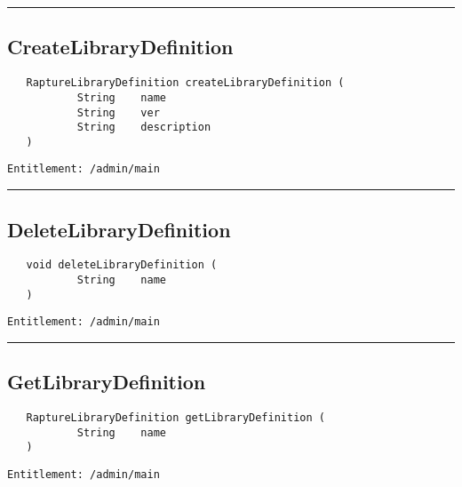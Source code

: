 \rule{12cm}{2pt}
\subsection{CreateLibraryDefinition}
\label{Api:CreateLibraryDefinition}
\begin{verbatim}
   RaptureLibraryDefinition createLibraryDefinition (
           String    name
           String    ver
           String    description
   )
\end{verbatim}
\begin{Verbatim}[fontsize=\small, formatcom=\color{Maroon}]
  Entitlement: /admin/main
\end{Verbatim}



\rule{12cm}{2pt}
\subsection{DeleteLibraryDefinition}
\label{Api:DeleteLibraryDefinition}
\begin{verbatim}
   void deleteLibraryDefinition (
           String    name
   )
\end{verbatim}
\begin{Verbatim}[fontsize=\small, formatcom=\color{Maroon}]
  Entitlement: /admin/main
\end{Verbatim}



\rule{12cm}{2pt}
\subsection{GetLibraryDefinition}
\label{Api:GetLibraryDefinition}
\begin{verbatim}
   RaptureLibraryDefinition getLibraryDefinition (
           String    name
   )
\end{verbatim}
\begin{Verbatim}[fontsize=\small, formatcom=\color{Maroon}]
  Entitlement: /admin/main
\end{Verbatim}



